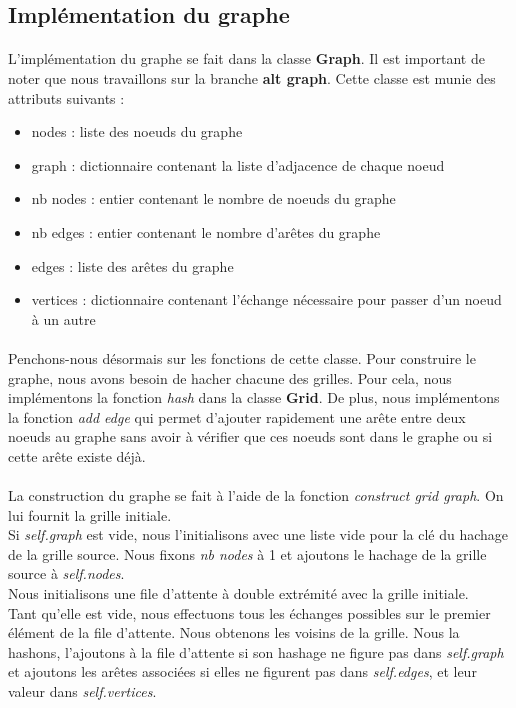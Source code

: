 \documentclass[12pt]{article}
\begin{document}
\subsection{Implémentation du graphe}
\paragraph{}
L'implémentation du graphe se fait dans la classe \textbf{Graph}. Il est important de noter que nous travaillons sur la branche \textbf{alt graph}. Cette classe est munie des attributs suivants :
\begin{itemize}
    \item nodes : liste des noeuds du graphe
    \item graph : dictionnaire contenant la liste d'adjacence de chaque noeud
    \item nb nodes : entier contenant le nombre de noeuds du graphe
    \item nb edges : entier contenant le nombre d'arêtes du graphe
    \item edges : liste des arêtes du graphe
    \item vertices : dictionnaire contenant l'échange nécessaire pour passer d'un noeud à un autre
\end{itemize}

\paragraph{}
Penchons-nous désormais sur les fonctions de cette classe. Pour construire le graphe, nous avons besoin de hacher chacune des grilles. Pour cela, nous implémentons la fonction \textit{hash} dans la classe \textbf{Grid}. De plus, nous implémentons la fonction \textit{add edge} qui permet d'ajouter rapidement une arête entre deux noeuds au graphe sans avoir à vérifier que ces noeuds sont dans le graphe ou si cette arête existe déjà. 

\paragraph{}
La construction du graphe se fait à l'aide de la fonction \textit{construct grid graph}. On lui fournit la grille initiale. \\
Si \textit{self.graph} est vide, nous l'initialisons avec une liste vide pour la clé du hachage de la grille source. Nous fixons \textit{nb nodes} à 1 et ajoutons le hachage de la grille source à \textit{self.nodes}.\\
Nous initialisons une file d’attente à double extrémité avec la grille initiale. \\
Tant qu'elle est vide, nous effectuons tous les échanges possibles sur le premier élément de la file d'attente. Nous obtenons les voisins de la grille. Nous la hashons, l'ajoutons à la file d'attente si son hashage ne figure pas dans \textit{self.graph} et ajoutons les arêtes associées si elles ne figurent pas dans \textit{self.edges}, et leur valeur dans \textit{self.vertices}. 
\end{document}

